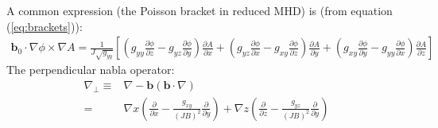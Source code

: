 \documentclass[12pt]{article}
\def\L{\left}
\def\R{\right}
\newcommand{\deriv}[2]{\ensuremath{\frac{\partial #1}{\partial #2}}}
\newcommand{\ve}[1]{\ensuremath{\boldsymbol{#1}}}
\newcommand{\bvec}{\ve{b}}
\begin{document}
%
A common expression (the Poisson bracket in reduced MHD) is (from equation
(\ref{eq:brackets})):
%
\begin{align*}
\bvec_0\cdot\nabla\phi\times\nabla A =
\frac{1}{J\sqrt{g_{yy}}}\L[\L(g_{yy}\deriv{\phi}{z} -
g_{yz}\deriv{\phi}{y}\R)\deriv{A}{x} + \L(g_{yz}\deriv{\phi}{x} -
g_{xy}\deriv{\phi}{z}\R)\deriv{A}{y} + \L(g_{xy}\deriv{\phi}{y} -
g_{yy}\deriv{\phi}{x}\R)\deriv{A}{z}\R]
\end{align*}
%
The perpendicular nabla operator:
%
\begin{align*}
\nabla_\perp \equiv& \nabla - \ve{b}\L(\ve{b}\cdot\nabla\R) \\ =& \nabla
    x\L(\deriv{}{x} - \frac{g_{xy}}{\L(JB\R)^2}\deriv{}{y}\R) + \nabla
    z\L(\deriv{}{z} - \frac{g_{yz}}{\L(JB\R)^2}\deriv{}{y}\R)
\end{align*}
%
\end{document}
